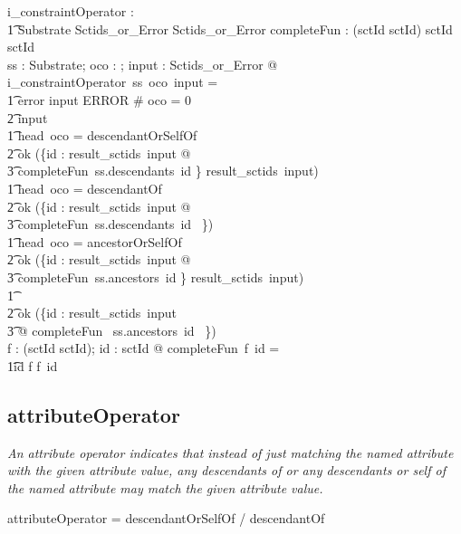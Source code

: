\documentclass{article}
\def\bnf#1{{\scriptsize {{#1}} }}
\def\desc#1{{\small \textsl{{#1}} }}
\begin{document}
\begin{gendef}
   i\_constraintOperator : \\
\t1 Substrate \fun \optional[constraintOperator] \fun Sctids\_or\_Error \fun Sctids\_or\_Error
\also
   completeFun : (sctId \pfun \power sctId) \fun sctId \fun \power sctId \\
\where
	\forall ss : Substrate; oco : \optional[constraintOperator]; input : Sctids\_or\_Error @ \\
i\_constraintOperator~ss~oco~input = \\
\t1 \IF error \inv input \in ERROR \lor \# oco = 0  \THEN  \\
\t2 input \\
\t1 \ELSE \IF head~oco = descendantOrSelfOf \THEN \\
\t2 ok (\bigcup \{id : result\_sctids~input @ \\
\t3 completeFun~ss.descendants~id \} \cup result\_sctids~input) \\
\t1 \ELSE \IF head~oco = descendantOf~ \THEN \\
\t2 ok  (\bigcup \{id : result\_sctids~input @ \\
\t3 completeFun~ss.descendants~id ~\}) \\
\t1 \ELSE \IF head~oco = ancestorOrSelfOf~ \THEN  \\
\t2 ok (\bigcup \{id : result\_sctids~input @ \\
\t3 completeFun~ss.ancestors~id \} \cup result\_sctids~input) \\
\t1 \ELSE  \\
\t2 ok (\bigcup \{id : result\_sctids~input \\
\t3 @ completeFun~ ss.ancestors~id ~\}) \\
\also
   \forall f : (sctId \pfun \power sctId); id : sctId @ completeFun~f~id = \\
\t1\IF id \in \dom f \THEN f~id \ELSE \emptyset 
\end{gendef}

\subsection{attributeOperator}
\begin{framed}
\desc{An attribute operator indicates that instead of just matching the named attribute with the given attribute value, any descendants of or any descendants or self of the named attribute may match the given attribute value.}
\end{framed}
\begin{framed}
\bnf{attributeOperator = descendantOrSelfOf / descendantOf}
\end{framed}
\end{document}
